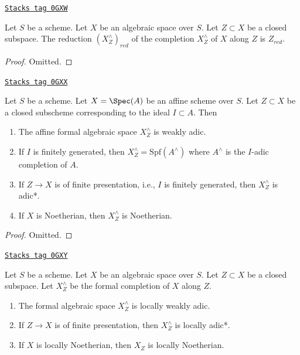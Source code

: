 \begin{lemma}
\label{formal-spaces-lemma-reduction-completion-subspace}
\href{https://stacks.math.columbia.edu/tag/0GXW}{\texttt{Stacks tag 0GXW}}

Let $S$ be a scheme. Let $X$ be an algebraic space over $S$.
Let $Z \subset X$ be a closed subspace. The reduction $(X^\wedge_Z)_{red}$
of the completion $X^\wedge_Z$ of $X$ along $Z$ is $Z_{red}$.
\end{lemma}

\begin{proof}
Omitted.
\end{proof}

\begin{lemma}
\label{formal-spaces-lemma-affine-formal-completion-subspace-types}
\href{https://stacks.math.columbia.edu/tag/0GXX}{\texttt{Stacks tag 0GXX}}

Let $S$ be a scheme. Let $X = \Spec(A)$ be an affine scheme over $S$.
Let $Z \subset X$ be a closed subscheme corresponding to the ideal
$I \subset A$. Then
\begin{enumerate}
\item The affine formal algebraic space $X^\wedge_Z$ is weakly adic.
\item If $I$ is finitely generated, then
$X^\wedge_Z = \text{Spf}(A^\wedge)$ where $A^\wedge$ is the
$I$-adic completion of $A$.
\item If $Z \to X$ is of finite presentation, i.e., $I$ is
finitely generated, then $X^\wedge_Z$ is adic*.
\item If $X$ is Noetherian, then $X^\wedge_Z$ is Noetherian.
\end{enumerate}
\end{lemma}

\begin{proof}
Omitted.
\end{proof}

\begin{lemma}
\label{formal-spaces-lemma-formal-completion-subspace-types}
\href{https://stacks.math.columbia.edu/tag/0GXY}{\texttt{Stacks tag 0GXY}}

Let $S$ be a scheme. Let $X$ be an algebraic space over $S$.
Let $Z \subset X$ be a closed subspace. Let $X^\wedge_Z$ be the
formal completion of $X$ along $Z$.
\begin{enumerate}
\item The formal algebraic space $X^\wedge_Z$ is locally weakly adic.
\item If $Z \to X$ is of finite presentation,
then $X^\wedge_Z$ is locally adic*.
\item If $X$ is locally Noetherian, then $X_Z$ is locally
Noetherian.
\end{enumerate}
\end{lemma}

